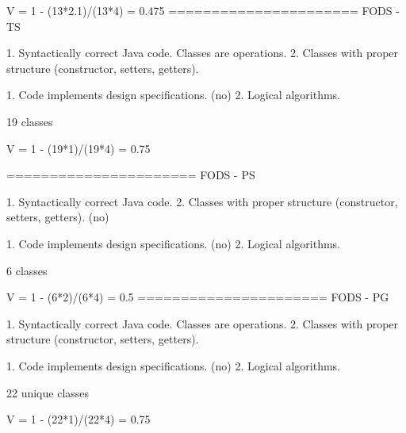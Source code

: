 V = 1 - (13*2.1)/(13*4) = 0.475
======================
FODS - TS

1. Syntactically correct Java code. Classes are operations. 
2. Classes with proper structure (constructor, setters, getters). 

1. Code implements design specifications. (no)
2. Logical algorithms. 

19 classes

V = 1 - (19*1)/(19*4) = 0.75

======================
FODS - PS

1. Syntactically correct Java code. 
2. Classes with proper structure (constructor, setters, getters). (no)

1. Code implements design specifications. (no)
2. Logical algorithms. 

6 classes

V = 1 - (6*2)/(6*4) = 0.5
======================
FODS - PG

1. Syntactically correct Java code. Classes are operations. 
2. Classes with proper structure (constructor, setters, getters). 

1. Code implements design specifications. (no)
2. Logical algorithms. 

22 unique classes

V = 1 - (22*1)/(22*4) = 0.75

